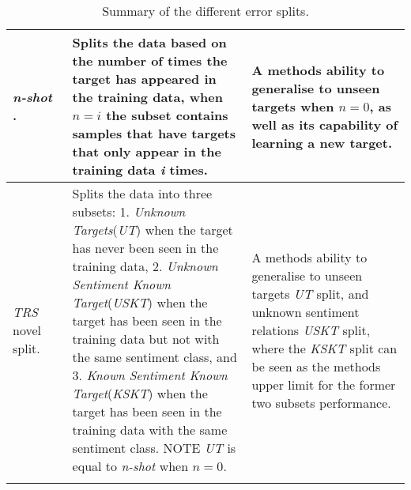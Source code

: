 \begin{longtable}{|p{0.15\linewidth}|p{0.45\linewidth}|p{0.4\linewidth}|}
\hline
\textit{n-shot} \citep{yang2018multi}. & Splits the data based on the number of times the target has appeared in the training data, when $n=i$ the subset contains samples that have targets that only appear in the training data \textit{i} times. & A methods ability to generalise to unseen targets when $n=0$, as well as its capability of learning a new target. \\
\hline
\textit{TRS} novel split. & Splits the data into three subsets: 1. \textit{Unknown Targets}(\textit{UT}) when the target has never been seen in the training data, 2. \textit{Unknown Sentiment Known Target}(\textit{USKT}) when the target has been seen in the training data but not with the same sentiment class, and 3. \textit{Known Sentiment Known Target}(\textit{KSKT}) when the target has been seen in the training data with the same sentiment class. NOTE \textit{UT} is equal to \textit{n-shot} when $n=0$. & A methods ability to generalise to unseen targets \textit{UT} split, and unknown sentiment relations \textit{USKT} split, where the \textit{KSKT} split can be seen as the methods upper limit for the former two subsets performance. \\
\hline
\caption{Summary of the different error splits.}
\label{table:aug_error_split_summary}
\end{longtable}